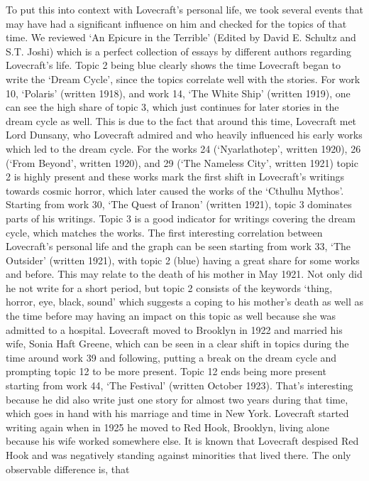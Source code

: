 To put this into context with Lovecraft’s personal life, we took several events that may have had 
a significant influence on him and checked for the topics of that time. We reviewed ‘An Epicure in 
the Terrible’ (Edited by David E. Schultz and S.T. Joshi) which is a perfect collection of essays 
by different authors regarding Lovecraft’s life. Topic 2 being blue clearly shows the time Lovecraft 
began to write the ‘Dream Cycle’, since the topics correlate well with the stories. For work 10, 
‘Polaris’ (written 1918), and work 14, ‘The White Ship’ (written 1919), one can see the high share 
of topic 3, which just continues for later stories in the dream cycle as well. This is due to the 
fact that around this time, Lovecraft met Lord Dunsany, who Lovecraft admired and who heavily 
influenced his early works which led to the dream cycle. For the works 24 (‘Nyarlathotep’, 
written 1920), 26 (‘From Beyond’, written 1920), and 29 (‘The Nameless City’, written 1921) 
topic 2 is highly present and these works mark the first shift in Lovecraft’s writings towards 
cosmic horror, which later caused the works of the ‘Cthulhu Mythos’. Starting from work 30, ‘The 
Quest of Iranon’ (written 1921), topic 3 dominates parts of his writings. Topic 3 is a good indicator 
for writings covering the dream cycle, which matches the works. The first interesting correlation 
between Lovecraft’s personal life and the graph can be seen starting from work 33, ‘The Outsider’ 
(written 1921), with topic 2 (blue) having a great share for some works and before. This may relate 
to the death of his mother in May 1921. Not only did he not write for a short period, but topic 2 
consists of the keywords ‘thing, horror, eye, black, sound’ which suggests a coping to his mother’s 
death as well as the time before may having an impact on this topic as well because she was admitted 
to a hospital. Lovecraft moved to Brooklyn in 1922 and married his wife, Sonia Haft Greene, which 
can be seen in a clear shift in topics during the time around work 39 and following, putting a break 
on the dream cycle and prompting topic 12 to be more present. Topic 12 ends being more present starting 
from work 44, ‘The Festival’ (written October 1923). That’s interesting because he did also write just 
one story for almost two years during that time, which goes in hand with his marriage and time in New 
York. Lovecraft started writing again when in 1925 he moved to Red Hook, Brooklyn, living alone 
because his wife worked somewhere else. It is known that Lovecraft despised Red Hook and was 
negatively standing against minorities that lived there. The only observable difference is, that 
